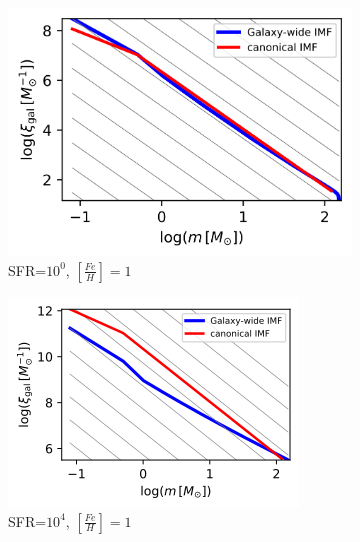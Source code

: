 \begin{figure}
	\centering
		\begin{subfigure}[b]{0.4\textwidth}
		\includegraphics[width=\textwidth]{sfr1-feh1.png}
		\caption{SFR=$10^{0}$, $[\frac{Fe}{H}]=1$}
		\label{fig:s1e4-1}
	\end{subfigure}
	\begin{subfigure}[b]{0.4\textwidth}
		\includegraphics[width=\textwidth]{sfr1e4-feh1.png}
		\caption{SFR=$10^{4}$, $[\frac{Fe}{H}]=1$}
		\label{fig:s1e4-1}
	\end{subfigure}
\begin{subfigure}[b]{0.45\textwidth}

\end{subfigure}
\end{figure}
